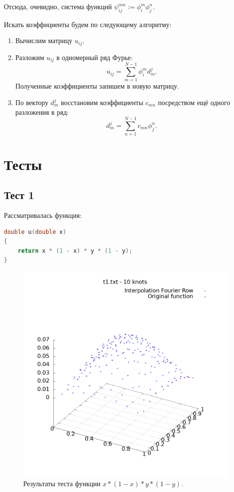 \documentclass[14pt,a4paper]{extarticle}
\newcommand{\1}{\mathbbm{1}}
\begin{document}
Отсюда, очевидно, система функций $\psi_{ij}^{mn} := \phi_i^m \phi_j^n $. \par
Искать коэффициенты будем по следующему алгоритму: 
\begin{enumerate}
    \item Вычислим матрицу $u_{ij}$.
    \item Разложим $u_{ij}$ в одномерный ряд Фурье:
        \begin{equation*}
            u_{ij} = \sum _{m = 1}^{N - 1} \phi_i^m d_m^j.
        \end{equation*}
        Полученные коэффициенты запишем в новую матрицу.
    \item По вектору $d_m^j$ восстановим коэффициенты $c_{mn}$ посредством ещё одного разложения в ряд:
        \begin{equation*}
            d_m^j = \sum _{n = 1}^{N - 1} c_{mn} \phi_j^n.
        \end{equation*}
\end{enumerate}


\section{Тесты}
\subsection{Тест 1}
Рассматривалась функция:
\begin{lstlisting}[language=c]
    double u(double x)
{
    return x * (1 - x) * y * (1 - y);
}
    \end{lstlisting}

    \begin{figure}
        \centering
        \includegraphics[scale=0.5]{Images/t1.txt.png}
        \caption{Результаты теста функции $x * (1 - x) * y * (1 - y)$.}
    \end{figure}
\end{document}
